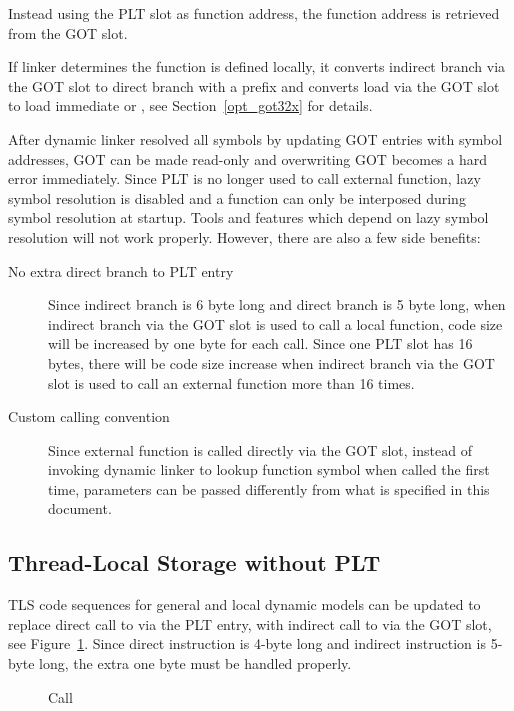 Instead using the PLT slot as function address, the function address
is retrieved from the GOT slot.

If linker determines the function is defined locally, it converts
indirect branch via the GOT slot to direct branch with a 
prefix and converts load via the GOT slot to load immediate or
, see Section~\ref{opt_got32x} for details.

After dynamic linker resolved all symbols by updating GOT entries with
symbol addresses, GOT can be made read-only and overwriting GOT becomes
a hard error immediately.  Since PLT is no longer used to call external
function, lazy symbol resolution is disabled and a function can only be
interposed during symbol resolution at startup.  Tools and features which
depend on lazy symbol resolution will not work properly.  However, there
are also a few side benefits:

\begin{description}
\item[No extra direct branch to PLT entry]  Since indirect branch is 6
  byte long and direct branch is 5 byte long, when indirect branch via
  the GOT slot is used to call a local function, code size will be
  increased by one byte for each call.  Since one PLT slot has 16 bytes,
  there will be code size increase when indirect branch via the GOT slot
  is used to call an external function more than 16 times.
\item[Custom calling convention]  Since external function is called
  directly via the GOT slot, instead of invoking dynamic linker to
  lookup function symbol when called the first time, parameters can be
  passed differently from what is specified in this document.
\end{description}

\subsection{Thread-Local Storage without PLT}

TLS code sequences for general and local dynamic models can be updated to
replace direct call to  via the PLT entry,
with indirect call to  via the GOT slot, see
Figure~\ref{___tls_get_addr}.  Since direct
 instruction is 4-byte long and indirect 
instruction is 5-byte long, the extra one byte must be handled properly.

\begin{figure}[H]
\Hrule
\caption{ Call}
\label{___tls_get_addr}
\begin{center}
\myfontsize{}
\end{center}
\Hrule
\end{figure}

